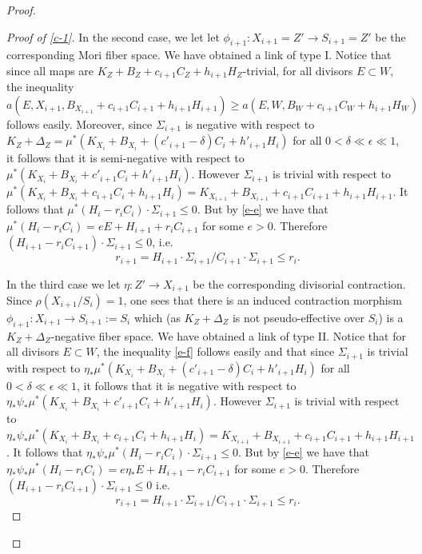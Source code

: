 \documentclass[12pt]{amsart}
\theoremstyle{plain}
\begin{document}
\begin{proof}
\begin{proof}[Proof of \ref{c-1}]
In the second case, we let let $\phi _{i+1}:X_{i+1}=Z'\to S_{i+1}=Z'$ be the 
corresponding Mori fiber space. We have obtained a link of type I.
Notice that since all maps are $K_Z+B_Z+c_{i+1}C_Z+h_{i+1}H_Z$-trivial, for all divisors $E\subset W$, the inequality
\begin{equation}\label{e-f}
a(E,X_{i+1},B_{X_{i+1}}+c_{i+1}C_{i+1}+h_{i+1}H_{i+1})\geq 
a(E,W,B_W+c_{i+1}C_W+h_{i+1}H_W)\end{equation}
follows easily. Moreover, since $\Sigma _{i+1}$ is negative with respect to
$K_Z+\Delta _Z=\mu^*(K_ {X_{i  }}+B_{X_{i  }}+(c'_{i+1}-\delta)C_{i  }+h'_{i+1}H_{i})$ for
all $0<\delta \ll \epsilon \ll 1$, it follows that it is semi-negative
with respect to
$\mu^*(K_ {X_{i  }}+B_{X_{i  }}+c'_{i+1}C_{i  }+h'_{i+1}H_{i})$.
However $\Sigma _{i+1}$ is trivial with respect to $\mu^*(K_ {X_{i  }}+
B_{X_{i  }}+c_{i+1}C_{i  }+h_{i+1}H_{i})=K_ {X_{i +1 }}+B_{X_{i+1  }}+
c_{i+1}C_{i +1 }+h_{i+1}H_{i+1}$. It follows that $\mu ^*(H_i-r_iC_i)\cdot
 \Sigma _{i+1}\leq 0$. But by \eqref{e-e} we have that $\mu ^*(H_i-r_iC_i)=eE+
H_{i+1}+r_iC_{i+1}$ for some $e>0$. Therefore
$(H_{i+1}-r_iC_{i+1})\cdot \Sigma _{i+1}\leq 0$, i.e.
$$r_{i+1}=H_{i+1}\cdot \Sigma _{i+1}/C_{i+1}\cdot \Sigma _{i+1}\leq r_i.$$


In the third case we let $\eta :Z'\to X_{i+1}$ be the corresponding divisorial contraction. Since $\rho (X_{i+1}/S_i)=1$, one sees that there is an induced
contraction morphism $\phi _{i+1}:X_{i+1}\to S_{i+1}:=S_i$
which (as $K_Z+\Delta _Z$ is not pseudo-effective over $S_i$)
is a $K_Z+\Delta _Z$-negative 
fiber space. We have obtained a link of type II.
Notice that for all divisors $E\subset W$, the inequality \eqref{e-f}
follows easily and that since $\Sigma _{i+1}$ is trivial with respect to
$\eta _* \mu^*(K_ {X_{i  }}+B_{X_{i  }}+(c'_{i+1}-\delta)C_{i  }+h'_{i+1}H_{i})$ for
all $0<\delta \ll \epsilon \ll 1$, it follows that it is negative
with respect to
$\eta _* \psi _*\mu^*(K_ {X_{i  }}+B_{X_{i  }}+c'_{i+1}C_{i  }+h'_{i+1}H_{i})$.
However $\Sigma _{i+1}$ is trivial with respect to $\eta _*\psi _*\mu^*(K_ {X_{i  }}+
B_{X_{i  }}+c_{i+1}C_{i  }+h_{i+1}H_{i})=K_ {X_{i +1 }}+B_{X_{i+1  }}+
c_{i+1}C_{i +1 }+h_{i+1}H_{i+1}$. It follows that $\eta _*\psi _* \mu ^*(H_i-r_iC_i)\cdot
 \Sigma _{i+1}\leq  0$. But by \eqref{e-e} we have that $\eta _*\psi _* \mu ^*(H_i-r_iC_i)=e\eta _*E+
H_{i+1}-r_iC_{i+1}$ for some $e>0$. Therefore
$(H_{i+1}-r_iC_{i+1})\cdot \Sigma _{i+1}\leq 0$ i.e.
$$r_{i+1}=H_{i+1}\cdot \Sigma _{i+1}/C_{i+1}\cdot \Sigma _{i+1}\leq r_i.$$


\end{proof}
\end{proof}
\end{document}
